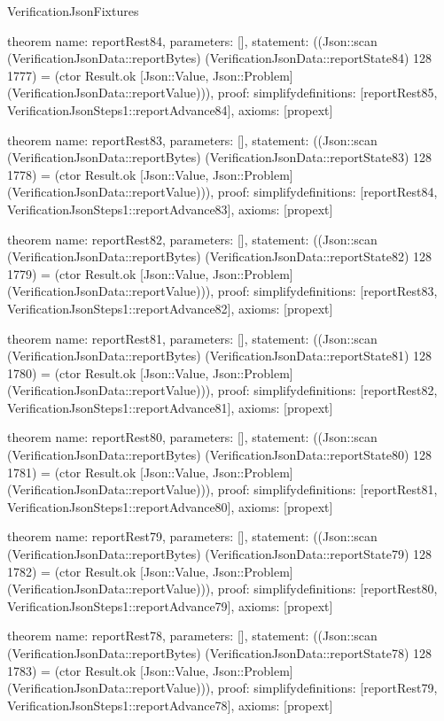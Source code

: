 \begin{lexlean}{VerificationJsonFixtures}
\begin{semanticmodule}
theorem{
  name: reportRest84,
  parameters: [],
  statement: ((Json::scan (VerificationJsonData::reportBytes) (VerificationJsonData::reportState84) 128 1777) = (ctor Result.ok [Json::Value, Json::Problem] (VerificationJsonData::reportValue))),
  proof: simplify{definitions: [reportRest85, VerificationJsonSteps1::reportAdvance84]},
  axioms: [propext]
}

theorem{
  name: reportRest83,
  parameters: [],
  statement: ((Json::scan (VerificationJsonData::reportBytes) (VerificationJsonData::reportState83) 128 1778) = (ctor Result.ok [Json::Value, Json::Problem] (VerificationJsonData::reportValue))),
  proof: simplify{definitions: [reportRest84, VerificationJsonSteps1::reportAdvance83]},
  axioms: [propext]
}

theorem{
  name: reportRest82,
  parameters: [],
  statement: ((Json::scan (VerificationJsonData::reportBytes) (VerificationJsonData::reportState82) 128 1779) = (ctor Result.ok [Json::Value, Json::Problem] (VerificationJsonData::reportValue))),
  proof: simplify{definitions: [reportRest83, VerificationJsonSteps1::reportAdvance82]},
  axioms: [propext]
}

theorem{
  name: reportRest81,
  parameters: [],
  statement: ((Json::scan (VerificationJsonData::reportBytes) (VerificationJsonData::reportState81) 128 1780) = (ctor Result.ok [Json::Value, Json::Problem] (VerificationJsonData::reportValue))),
  proof: simplify{definitions: [reportRest82, VerificationJsonSteps1::reportAdvance81]},
  axioms: [propext]
}

theorem{
  name: reportRest80,
  parameters: [],
  statement: ((Json::scan (VerificationJsonData::reportBytes) (VerificationJsonData::reportState80) 128 1781) = (ctor Result.ok [Json::Value, Json::Problem] (VerificationJsonData::reportValue))),
  proof: simplify{definitions: [reportRest81, VerificationJsonSteps1::reportAdvance80]},
  axioms: [propext]
}

theorem{
  name: reportRest79,
  parameters: [],
  statement: ((Json::scan (VerificationJsonData::reportBytes) (VerificationJsonData::reportState79) 128 1782) = (ctor Result.ok [Json::Value, Json::Problem] (VerificationJsonData::reportValue))),
  proof: simplify{definitions: [reportRest80, VerificationJsonSteps1::reportAdvance79]},
  axioms: [propext]
}

theorem{
  name: reportRest78,
  parameters: [],
  statement: ((Json::scan (VerificationJsonData::reportBytes) (VerificationJsonData::reportState78) 128 1783) = (ctor Result.ok [Json::Value, Json::Problem] (VerificationJsonData::reportValue))),
  proof: simplify{definitions: [reportRest79, VerificationJsonSteps1::reportAdvance78]},
  axioms: [propext]
}


\end{semanticmodule}
\end{lexlean}
